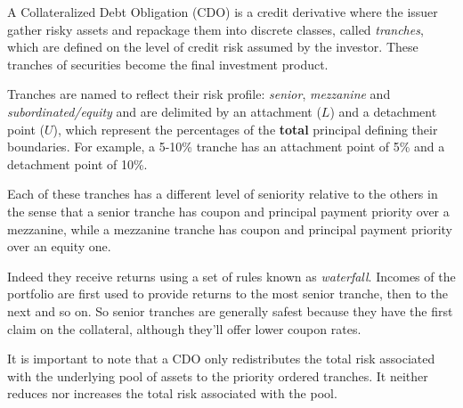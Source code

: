 A Collateralized Debt Obligation (CDO) is a credit derivative where the issuer 
gather risky assets and repackage them into discrete classes, called \emph{tranches}, which are defined on the level of credit risk assumed by the investor. 
These tranches of securities become the final investment product.

Tranches are named to reflect their risk profile: \emph{senior}, \emph{mezzanine} and \emph{subordinated/equity} and are delimited by an attachment ($L$) and a detachment point ($U$), which represent the percentages of the \textbf{total} principal defining their boundaries. 
For example, a 5-10\% tranche has an attachment point of 5\% and a detachment point of 10\%. 

Each of these tranches has a different level of seniority relative to the others in the sense that a senior tranche has coupon and principal payment priority over a mezzanine, while a mezzanine tranche has coupon and principal payment priority over an equity one. 

Indeed they receive returns using a set of rules known as \emph{waterfall}. Incomes of the portfolio are first used to provide returns to the most senior tranche, then to the next and so on. So senior tranches are generally safest because they have the first claim on the collateral, although they'll offer lower coupon rates.

It is important to note that a CDO only redistributes the total risk associated with the underlying pool of assets to the priority ordered tranches. It neither reduces nor increases the total risk associated with the pool.

